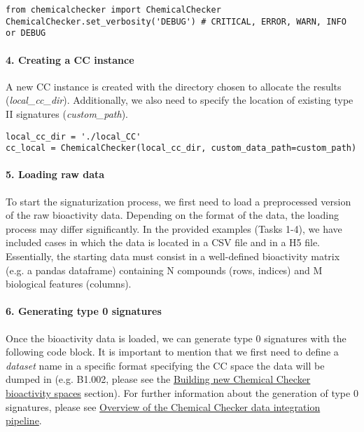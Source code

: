\begin{lstlisting}
from chemicalchecker import ChemicalChecker
ChemicalChecker.set_verbosity('DEBUG') # CRITICAL, ERROR, WARN, INFO or DEBUG
\end{lstlisting}




\paragraph{4. Creating a CC instance} \leavevmode

A new CC instance is created with the directory chosen to allocate the results (\textit{local\_cc\_dir}). Additionally, we also need to specify the location of existing type II signatures (\textit{custom\_path}). \\

\begin{lstlisting}
local_cc_dir = './local_CC'
cc_local = ChemicalChecker(local_cc_dir, custom_data_path=custom_path)
\end{lstlisting}

\paragraph{5. Loading raw data} \leavevmode

To start the signaturization process, we first need to load a preprocessed version of the raw bioactivity data. Depending on the format of the data, the loading process may differ significantly. In the provided examples (Tasks 1-4), we have included cases in which the data is located in a CSV file and in a H5 file. Essentially, the starting data must consist in a well-defined bioactivity matrix (e.g. a pandas dataframe) containing N compounds (rows, indices) and M biological features (columns). 

\paragraph{6. Generating type 0 signatures} \leavevmode

Once the bioactivity data is loaded, we can generate type 0 signatures with the following code block. It is important to mention that we first need to define a \textit{dataset} name in a specific format specifying the CC space the data will be dumped in (e.g. B1.002, please see the \hyperref[Building_NEW_CC_BIOACTIVITY_SPACES]{Building new Chemical Checker bioactivity spaces} section). For further information about the generation of type 0 signatures, please see \hyperref[Overview of the Chemical Checker data integration pipeline]{Overview of the Chemical Checker data integration pipeline}. \\ \\

